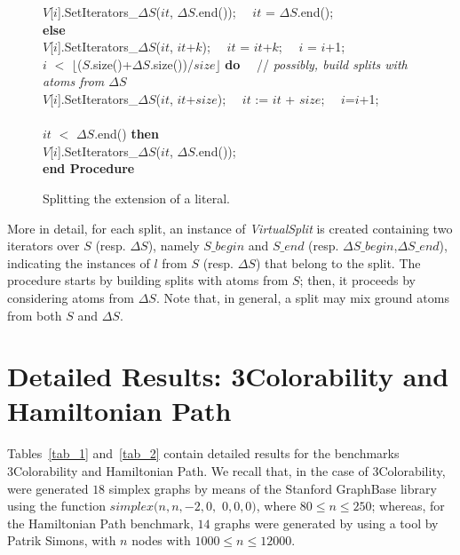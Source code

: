 \documentclass[preprint]{tlp}
\newcommand{\DNF}{\ensuremath{\Delta S}\xspace}
\begin{document}
\begin{figure}[h!]
\begin{tabbing}
\>\>\> $V$[$i$].SetIterators\_\DNF($it$, \DNF.end()); \ \  $it$ = \DNF.end();\\
\>\> {\bf else}\\
\>\>\> $V$[$i$].SetIterators\_\DNF($it$, $it$+$k$); \ \  $it$ = $it$+$k$; \ \ $i$ = $i$+1;\\
 $i$ $<$ $\lfloor$($S$.size()+\DNF.size())/$size$$\rfloor$ {\bf do} \ \ // {\em possibly, build splits with atoms from \DNF}\\
\>\> $V$[$i$].SetIterators\_\DNF($it$, $it$+$size$); \ \ $it$ := $it$ + $size$; \ \ $i$=$i$+1;\\
\\
 $it$ $<$ \DNF.end() {\bf then}\\
\>\> $V$[$i$].SetIterators\_\DNF($it$, \DNF.end());\\
{\bf end Procedure} \\
\end{tabbing}\vspace{-0.3cm}
\caption{Splitting the extension of a literal.} \vspace{-0.2cm}
\end{figure}\label{fig:splitextension}


\noindent More in detail, for each  split, an instance of {\em VirtualSplit} is created containing two iterators over $S$
(resp. \DNF), namely $S\_begin$ and $S\_end$ (resp.
$\DNF\_begin$,$\DNF\_end$), indicating the instances of $l$ from $S$
(resp. \DNF) that belong to the split. 
The procedure starts by building splits with atoms from $S$; then, it proceeds
by considering atoms from \DNF. Note that, in general, a split may mix ground atoms 
from both $S$ and \DNF. 

\clearpage

\section{Detailed Results: 3Colorability and Hamiltonian Path}
\label{app:results}

Tables~\ref{tab_1} and~\ref{tab_2} contain detailed results for the benchmarks 3Colorability and Hamiltonian Path.
We recall that, in the case of 3Colorability, were generated $18$ simplex graphs by means of
the Stanford GraphBase library using the function $simplex(n,n,-2,0,$ $0,0,0)$, where $80\leq n \leq 250$;
whereas, for the Hamiltonian Path benchmark, $14$ graphs were generated by using
a tool by Patrik Simons, with $n$ nodes  with $1000 \leq n \leq 12000$.
\end{document}
